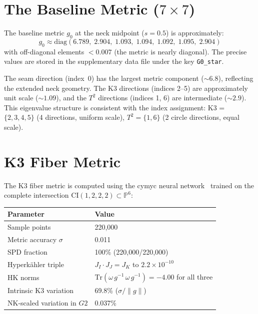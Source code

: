 \documentclass[11pt,a4paper]{article}
\newcommand{\Gtwo}{\mathrm{G}_2}
\newcommand{\Tr}{\mathrm{Tr}}
\newcommand{\norm}[1]{\|#1\|}
\theoremstyle{remark}
\def\Gtwo{G2}%
\begin{document}
\appendix

\section{The Baseline Metric ($7 \times 7$)}\label{app:baseline}

The baseline metric $g_0$ at the neck midpoint ($s = 0.5$) is approximately:
\[
g_0 \approx \mathrm{diag}(6.789,\; 2.904,\; 1.093,\; 1.094,\; 1.092,\; 1.095,\; 2.904)
\]
with off-diagonal elements $< 0.007$ (the metric is nearly diagonal). The precise
values are stored in the supplementary data file under the key \texttt{G0\_star}.

The seam direction (index~0) has the largest metric component (${\sim}6.8$), reflecting the
extended neck geometry. The K3 directions (indices 2--5) are approximately unit scale
(${\sim}1.09$), and the $T^2$ directions (indices 1, 6) are intermediate (${\sim}2.9$). This eigenvalue
structure is consistent with the index assignment: K3 = $\{2, 3, 4, 5\}$ (4 directions,
uniform scale), $T^2 = \{1, 6\}$ (2 circle directions, equal scale).

\section{K3 Fiber Metric}\label{app:k3}

The K3 fiber metric is computed using the cymyc neural network~\cite{cymyc} trained on the
complete intersection $\mathrm{CI}(1,2,2,2) \subset \mathbb{P}^6$:

\begin{table}[H]
\centering
\begin{tabular}{ll}
\toprule
\textbf{Parameter} & \textbf{Value} \\
\midrule
Sample points & 220,000 \\
Metric accuracy $\sigma$ & 0.011 \\
SPD fraction & 100\% (220,000/220,000) \\
Hyperk\"ahler triple & $J_I \cdot J_J = J_K$ to $2.2 \times 10^{-10}$ \\
HK norms & $\Tr(\omega\, g^{-1}\, \omega\, g^{-1}) = -4.00$ for all three \\
Intrinsic K3 variation & 69.8\% ($\sigma/\norm{g}$) \\
NK-scaled variation in $\Gtwo$ & 0.037\% \\
\bottomrule
\end{tabular}
\end{table}
\end{document}
